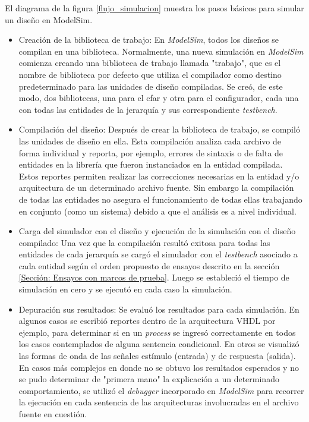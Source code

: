 El diagrama de la figura \ref{flujo_simulacion} muestra los pasos básicos para simular un diseño en ModelSim.

\begin{itemize}
\item
Creación de la biblioteca de trabajo:
En \textit{ModelSim}, todos los diseños se compilan en una biblioteca. Normalmente, una nueva simulación en \textit{ModelSim} comienza creando una biblioteca de trabajo llamada "trabajo", que es el nombre de biblioteca por defecto que utiliza el compilador como destino predeterminado para las unidades de diseño compiladas. Se creó, de este modo, dos bibliotecas, una para el cfar y otra para el configurador, cada una con todas las entidades de la jerarquía y sus correspondiente \textit{testbench}.

\item
Compilación del diseño:
Después de crear la biblioteca de trabajo, se compiló las unidades de diseño en ella. Esta compilación analiza cada archivo de forma individual y reporta, por ejemplo, errores de sintaxis o de falta de entidades en la librería que fueron instanciados en la entidad compilada. Estos reportes permiten realizar las correcciones necesarias en la entidad y/o arquitectura de un determinado archivo fuente. Sin embargo la compilación de todas las entidades no asegura el funcionamiento de todas ellas trabajando en conjunto (como un sistema) debido a que el análisis es a nivel individual.

\item
Carga del simulador con el diseño y ejecución de la simulación con el diseño compilado:
Una vez que la compilación resultó exitosa para todas las entidades de cada jerarquía se cargó el simulador con el \textit{testbench} asociado a cada entidad según el orden propuesto de ensayos descrito en la sección \ref{Sección: Ensayos con marcos de prueba}. Luego se estableció el tiempo de simulación en cero y se ejecutó en cada caso la simulación.

\item
Depuración sus resultados:
Se evaluó los resultados para cada simulación.
En algunos casos se escribió reportes dentro de la arquitectura VHDL por ejemplo, para determinar si en un \textit{process} se ingresó correctamente en todos los casos contemplados de alguna sentencia condicional. En otros se visualizó las formas de onda de las señales estímulo (entrada) y de respuesta (salida). En casos más complejos en donde no se obtuvo los resultados esperados y no se pudo determinar de "primera mano" la explicación a un determinado comportamiento, se utilizó el \textit{debugger} incorporado en \textit{ModelSim} para recorrer la ejecución en cada sentencia de las arquitecturas involucradas en el archivo fuente en cuestión.
\end{itemize}



